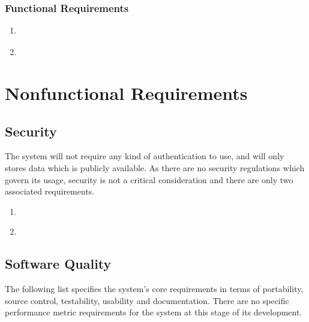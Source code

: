 \subsubsection{Functional Requirements}
\begin{enumerate}[F\thesubsection.1]
	\item\label{nf1.1}
	\item\label{nf1.2}
\end{enumerate}

\section{Nonfunctional Requirements} \label{sec:nfreqs}

\subsection{Security}
The system will not require any kind of authentication to use, and will only stores data which is publicly available. As there are no security regulations which govern its usage, security is not a critical consideration and there are only two associated requirements.
\begin{enumerate}[NF\thesubsection.1]
	\item\label{nf2.1}
	\item\label{nf2.2}
\end{enumerate}

\subsection{Software Quality}

The following list specifies the system's core requirements in terms of portability, source control, testability, usability and documentation. There are no specific performance metric requirements for the system at this stage of its development.

